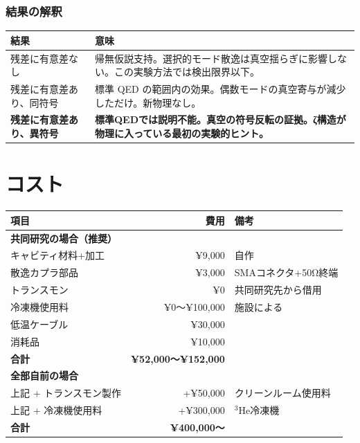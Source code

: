 \documentclass[12pt,a4paper]{article}
\begin{document}
\section{結果の解釈}

\begin{center}
\renewcommand{\arraystretch}{1.5}
\begin{tabular}{lp{8cm}}
\toprule
結果 & 意味 \\
\midrule
残差に有意差なし & 帰無仮説支持。選択的モード散逸は真空揺らぎに影響しない。この実験方法では検出限界以下。 \\
残差に有意差あり、同符号 & 標準 QED の範囲内の効果。偶数モードの真空寄与が減少しただけ。新物理なし。 \\
\textbf{残差に有意差あり、異符号} & \textbf{標準QEDでは説明不能。真空の符号反転の証拠。ζ構造が物理に入っている最初の実験的ヒント。} \\
\bottomrule
\end{tabular}
\end{center}

\part{コスト}

\begin{center}
\renewcommand{\arraystretch}{1.3}
\begin{tabular}{lrl}
\toprule
項目 & 費用 & 備考 \\
\midrule
\multicolumn{3}{l}{\textbf{共同研究の場合（推奨）}} \\
キャビティ材料+加工 & ¥9,000 & 自作 \\
散逸カプラ部品 & ¥3,000 & SMAコネクタ+50Ω終端 \\
トランスモン & ¥0 & 共同研究先から借用 \\
冷凍機使用料 & ¥0〜¥100,000 & 施設による \\
低温ケーブル & ¥30,000 & \\
消耗品 & ¥10,000 & \\
\midrule
\textbf{合計} & \textbf{¥52,000〜¥152,000} & \\
\midrule
\multicolumn{3}{l}{\textbf{全部自前の場合}} \\
上記 + トランスモン製作 & +¥50,000 & クリーンルーム使用料 \\
上記 + 冷凍機使用料 & +¥300,000 & $^3$He冷凍機 \\
\midrule
\textbf{合計} & \textbf{¥400,000〜} & \\
\bottomrule
\end{tabular}
\end{center}
\end{document}

